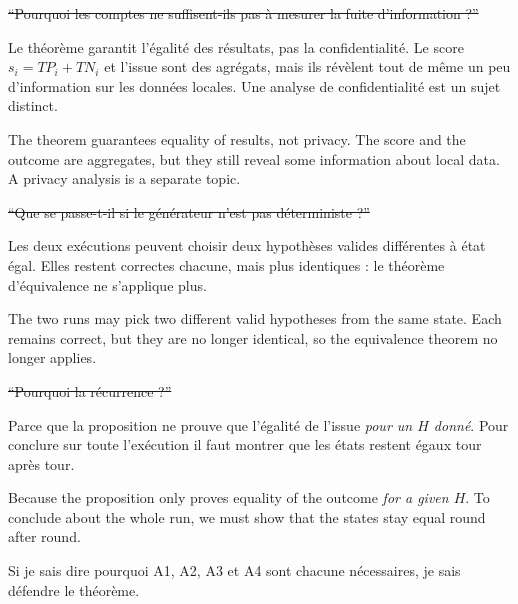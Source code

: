 \documentclass[10pt]{article}
\begin{document}

\st{``Pourquoi les comptes ne suffisent-ils pas à mesurer la fuite d'information ?''}
\begin{dire}
Le théorème garantit l'égalité des résultats, pas la confidentialité. Le score $s_i=TP_i+TN_i$ et l'issue sont des agrégats, mais ils révèlent tout de même
un peu d'information sur les données locales. Une analyse de confidentialité est un sujet distinct.
\end{dire}
\begin{direEN}
The theorem guarantees equality of results, not privacy. The score and the outcome are aggregates, but they still reveal some information about local data.
A privacy analysis is a separate topic.
\end{direEN}

\st{``Que se passe-t-il si le générateur n'est pas déterministe ?''}
\begin{dire}
Les deux exécutions peuvent choisir deux hypothèses valides différentes à état égal. Elles restent correctes chacune, mais plus identiques : le théorème d'équivalence ne s'applique plus.
\end{dire}
\begin{direEN}
The two runs may pick two different valid hypotheses from the same state. Each remains correct, but they are no longer identical, so the equivalence theorem no longer applies.
\end{direEN}

\st{``Pourquoi la récurrence ?''}
\begin{dire}
Parce que la proposition ne prouve que l'égalité de l'issue \emph{pour un $H$ donné}. Pour conclure sur toute l'exécution il faut montrer que les états restent égaux tour après tour.
\end{dire}
\begin{direEN}
Because the proposition only proves equality of the outcome \emph{for a given $H$}. To conclude about the whole run, we must show that the states stay equal round after round.
\end{direEN}

\vspace{8pt}
\begin{tcolorbox}[colback=marine, colframe=marine, arc=0pt, boxrule=0pt,
  halign=center, top=4pt, bottom=4pt]
\color{white}\small Si je sais dire pourquoi A1, A2, A3 et A4 sont chacune nécessaires, je sais défendre le théorème.
\end{tcolorbox}
\end{document}
